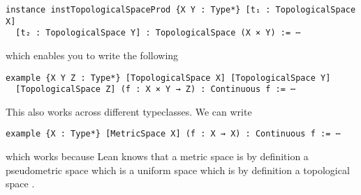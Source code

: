 \begin{lstlisting}
instance instTopologicalSpaceProd {X Y : Type*} [t₁ : TopologicalSpace X] 
  [t₂ : TopologicalSpace Y] : TopologicalSpace (X × Y) := ⋯
\end{lstlisting}

which enables you to write the following

\begin{lstlisting}
example {X Y Z : Type*} [TopologicalSpace X] [TopologicalSpace Y]
  [TopologicalSpace Z] (f : X × Y → Z) : Continuous f := ⋯
\end{lstlisting}

This also works across different typeclasses. 
We can write 

\begin{lstlisting}
example {X : Type*} [MetricSpace X] (f : X → X) : Continuous f := ⋯
\end{lstlisting}

which works because Lean knows that a metric space is by definition a pseudometric space 
\href{https://github.com/leanprover-community/mathlib4/blob/93828f4cd10fb8cab31700b110fd2751d36bf1b8/Mathlib/Topology/MetricSpace/Defs.lean#L36-L38}{\faExternalLink}
which is a uniform space
\href{https://github.com/leanprover-community/mathlib4/blob/93828f4cd10fb8cab31700b110fd2751d36bf1b8/Mathlib/Topology/MetricSpace/Pseudo/Defs.lean#L100-L119}{\faExternalLink}
which is by definition a topological space
\href{https://github.com/leanprover-community/mathlib4/blob/93828f4cd10fb8cab31700b110fd2751d36bf1b8/Mathlib/Topology/UniformSpace/Basic.lean#L278-L289}{\faExternalLink}.